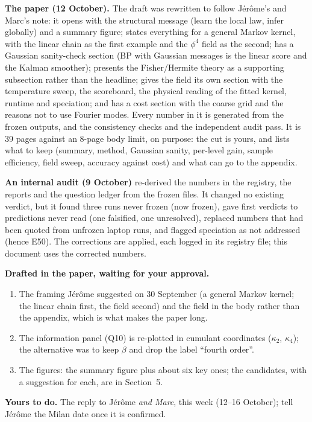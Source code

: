 \documentclass[11pt,a4paper]{article}
\begin{document}
\textbf{The paper (12 October).} The draft was rewritten to follow Jérôme's and Marc's note: it opens with the structural message (learn the
local law, infer globally) and a summary figure; states everything for a general Markov kernel, with the linear chain as the first
example and the $\phi^4$ field as the second; has a Gaussian sanity-check section (BP with Gaussian messages is the linear score
and the Kalman smoother); presents the Fisher/Hermite theory as a supporting subsection rather than the headline; gives the field its
own section with the temperature sweep, the scoreboard, the physical reading of the fitted kernel, runtime and speciation; and has a
cost section with the coarse grid and the reasons not to use Fourier modes. Every number in it is generated from the frozen outputs, and
the consistency checks and the independent audit pass. It is 39 pages against an 8-page body limit, on purpose: the cut is yours, and
 lists what to keep (summary, method, Gaussian sanity, per-level gain, sample efficiency, field
sweep, accuracy against cost) and what can go to the appendix.

\textbf{An internal audit (9 October)} re-derived the numbers in the registry, the reports and the question ledger from the frozen
files. It changed no existing verdict, but it found three runs never frozen (now frozen), gave first verdicts to predictions never
read (one falsified, one unresolved), replaced numbers that had been quoted from unfrozen laptop runs, and flagged speciation as not
addressed (hence E50). The corrections are applied, each logged in its registry file; this document uses the corrected numbers.

\textbf{Drafted in the paper, waiting for your approval.}
\begin{enumerate}[leftmargin=1.6em]
\item The framing Jérôme suggested on 30 September (a general Markov kernel; the linear chain first, the field second) and the field
in the body rather than the appendix, which is what makes the paper long.
\item The information panel (Q10) is re-plotted in cumulant coordinates ($\kappa_2$, $\kappa_4$); the alternative was to keep $\beta$
and drop the label ``fourth order''.
\item The figures: the summary figure plus about six key ones; the candidates, with a suggestion for each, are in Section~5.
\end{enumerate}

\textbf{Yours to do.} The reply to Jérôme \emph{and Marc}, this week (12--16 October); tell Jérôme the Milan date once it is confirmed.
\end{document}
